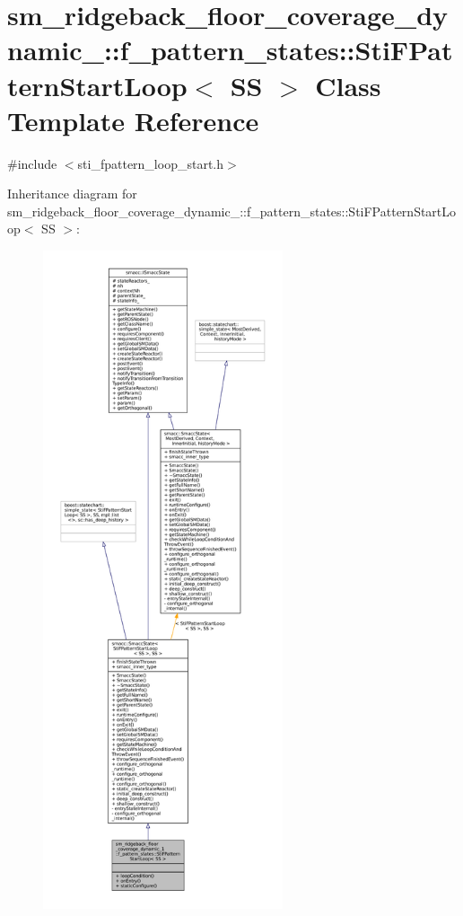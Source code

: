 \hypertarget{structsm__ridgeback__floor__coverage__dynamic__1_1_1f__pattern__states_1_1StiFPatternStartLoop}{}\section{sm\+\_\+ridgeback\+\_\+floor\+\_\+coverage\+\_\+dynamic\+\_\+:\+:f\+\_\+pattern\+\_\+states\+:\+:Sti\+F\+Pattern\+Start\+Loop$<$ SS $>$ Class Template Reference}
\label{structsm__ridgeback__floor__coverage__dynamic__1_1_1f__pattern__states_1_1StiFPatternStartLoop}


{\ttfamily \#include $<$sti\+\_\+fpattern\+\_\+loop\+\_\+start.\+h$>$}



Inheritance diagram for sm\+\_\+ridgeback\+\_\+floor\+\_\+coverage\+\_\+dynamic\+\_\+:\+:f\+\_\+pattern\+\_\+states\+:\+:Sti\+F\+Pattern\+Start\+Loop$<$ SS $>$\+:
\nopagebreak
\begin{figure}[H]
\begin{center}
\leavevmode
\includegraphics[height=550pt]{structsm__ridgeback__floor__coverage__dynamic__1_1_1f__pattern__states_1_1StiFPatternStartLoop__inherit__graph}
\end{center}
\end{figure}


